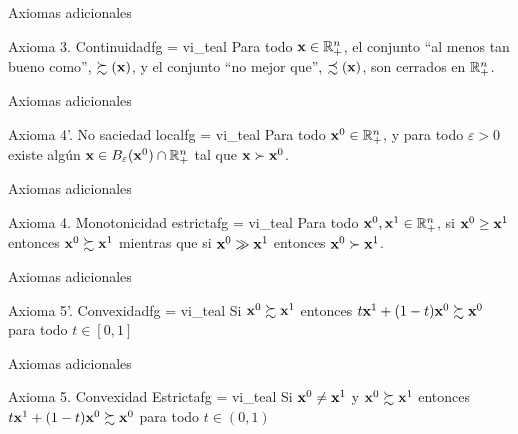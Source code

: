 \documentclass[10pt,aspectratio=169]{beamer}  %
\begin{document}
\begin{frame}{Axiomas adicionales}
	\begin{varblock}{Axioma 3. Continuidad}{fg = vi_teal}
    \vsf
      Para todo $\mathbf{x} \in \mathbb{R}^{n}_{+}$, el conjunto ``al menos tan bueno como'', $\succsim(\mathbf{x})$, y el conjunto
      ``no mejor que'', $\precsim(\mathbf{x})$, son cerrados en $\mathbb{R}^{n}_{+}$. 
    \vsf
  \end{varblock}

\end{frame}


\begin{frame}{Axiomas adicionales}
	\begin{varblock}{Axioma 4'. No saciedad local}{fg = vi_teal}
    \vsf
      Para todo $\mathbf{x}^0 \in \mathbb{R}^{n}_{+}$, y para todo $\varepsilon > 0$ existe algún $\mathbf{x} \in B_\varepsilon(\mathbf{x}^0) \cap \mathbb{R}^{n}_{+}$
      tal que $\mathbf{x} \succ \mathbf{x}^0$. 
    \vsf
  \end{varblock}

\end{frame}

\begin{frame}{Axiomas adicionales}
	\begin{varblock}{Axioma 4. Monotonicidad estricta}{fg = vi_teal}
    \vsf
      Para todo $\mathbf{x}^0, \mathbf{x}^1 \in \mathbb{R}^{n}_{+}$, si $\mathbf{x}^0 \geq \mathbf{x}^1$ entonces $\mathbf{x}^0 \succsim \mathbf{x}^1$ mientras que 
      si $\mathbf{x}^0 \gg \mathbf{x}^1$ entonces $\mathbf{x}^0 \succ \mathbf{x}^1$.
    \vsf
  \end{varblock}

\end{frame}

\begin{frame}{Axiomas adicionales}
	\begin{varblock}{Axioma 5'. Convexidad}{fg = vi_teal}
    \vsf
    Si  $\mathbf{x}^0 \succsim \mathbf{x}^1$ entonces $t \mathbf{x}^1 + (1-t) \mathbf{x}^0 \succsim \mathbf{x}^0 $ para todo $t \in [0,1]$
    \vsf
  \end{varblock}

\end{frame}

\begin{frame}{Axiomas adicionales}
	\begin{varblock}{Axioma 5. Convexidad Estricta}{fg = vi_teal}
    \vsf
    Si  $\mathbf{x}^0 \neq  \mathbf{x}^1$ y $\mathbf{x}^0 \succsim \mathbf{x}^1$ entonces $t \mathbf{x}^1 + (1-t) \mathbf{x}^0 \succsim \mathbf{x}^0 $ para todo $t \in (0,1)$
    \vsf
  \end{varblock}

\end{frame}
\end{document}
